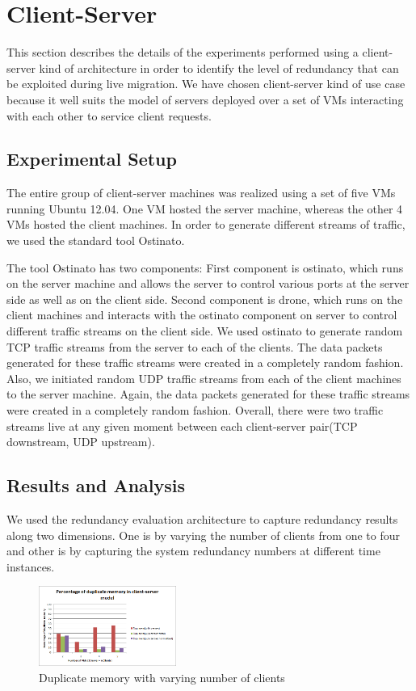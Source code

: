 \documentclass{acm_proc_article-sp}
\begin{document}
\section{Client-Server}
This section describes the details of the experiments performed using a client-server kind of architecture in order to identify the level of redundancy that can be exploited during live migration. We have chosen client-server kind of use case because it well suits the model of servers deployed over a set of VMs interacting with each other to service client requests.

\subsection{Experimental Setup}
The entire group of client-server machines was realized using a set of five VMs running Ubuntu 12.04. One VM hosted the server machine, whereas the other 4 VMs hosted the client machines. In order to generate different streams of traffic, we used the standard tool Ostinato.

The tool Ostinato has two components: First component is ostinato, which runs on the server machine and allows the server to control various ports at the server side as well as on the client side. Second component is drone, which runs on the client machines and interacts with the ostinato component on server to control different traffic streams on the client side. We used ostinato to generate random TCP traffic streams from the server to each of the clients. The data packets generated for these traffic streams were created in a completely random fashion. Also, we initiated random UDP traffic streams from each of the client machines to the server machine. Again, the data packets generated for these traffic streams were created in a completely random fashion. Overall, there were two traffic streams live at any given moment between each client-server pair(TCP downstream, UDP upstream).

\subsection{Results and Analysis}
We used the redundancy evaluation architecture to capture redundancy results along two dimensions. One is by varying the number of clients from one to four and other is by capturing the system redundancy numbers at different time instances.

\begin{figure}[htbp]
\centering
        \includegraphics[width=0.4\textwidth]{images/client-server1.png}
    \caption{Duplicate memory with varying number of clients}
    \label{fig:client-server1}
\end{figure}
\end{document}
